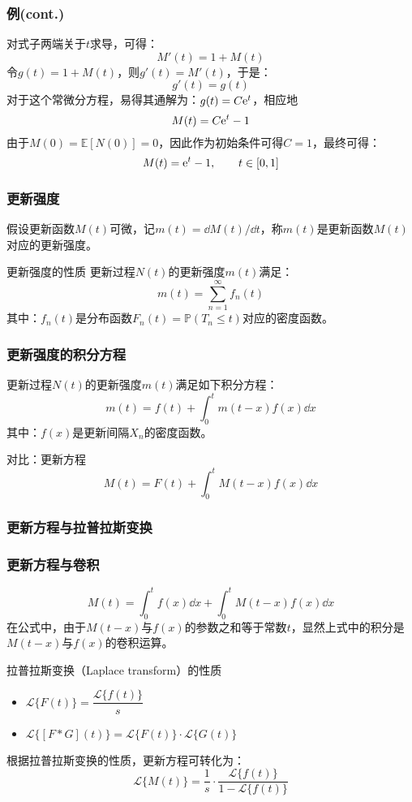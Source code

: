\documentclass[t]{beamer}
\renewcommand{\Pr}{\mathbb{P}}
\newcommand{\E}{\mathbb{E}}
\newcommand{\laplace}[2]{\mathcal{L}\{#1(#2)\}}
\begin{document}
\begin{frame}
  \frametitle{例(cont.)}
  对式子两端关于$t$求导，可得：
  \[    M'(t)=1+M(t)\]
  令$g(t)=1+M(t)$，则$g'(t)=M'(t)$，于是：
  \[g'(t) = g(t)\]
  对于这个常微分方程，易得其通解为：$g(t)=C{\rm e}^t$，相应地
  \[M(t)=C{\rm e}^t - 1\]
  由于$M(0)=\E[N(0)]=0$，因此作为初始条件可得$C=1$，最终可得：
  \[M(t)={\rm e}^t-1,\qquad t\in[0,1]\]
  

\end{frame}


\begin{frame}
  \frametitle{更新强度}
  假设更新函数$M(t)$可微，记$m(t)=\dd M(t)/\dd t$，称$m(t)$是更新函数$M(t)$对应的更新强度。
  
  \begin{block}{更新强度的性质}
    更新过程$N(t)$的更新强度$m(t)$满足：
    \begin{equation*}
        m(t)=\sum^{\infty}_{n=1}f_n(t)
    \end{equation*}
    其中：$f_n(t)$是分布函数$F_n(t)=\Pr(T_n\le t)$对应的密度函数。
    \end{block}
\end{frame}


\begin{frame}
  \frametitle{更新强度的积分方程}
  更新过程$N(t)$的更新强度$m(t)$满足如下积分方程：
  \begin{equation*}
      m(t)=f(t)+\int^t_0 m(t-x)f(x)\dd x
  \end{equation*}
  其中：$f(x)$是更新间隔$X_n$的密度函数。
  
\begin{block}{对比：更新方程}
  \begin{equation*}
    M(t)=F(t) +\int^{t}_0 M(t-x) f(x)\dd x 
\end{equation*}
\end{block}
\end{frame}


\subsubsection{更新方程与拉普拉斯变换}
\begin{frame}
  \frametitle{更新方程与卷积}
  \begin{equation*}
    M(t)=\int^t_0 f(x)\dd x+\int^{t}_0 M(t-x) f(x)\dd x 
\end{equation*}
在公式中，由于$M(t-x)$与$f(x)$的参数之和等于常数$t$，显然上式中的积分是$M(t-x)$与$f(x)$的卷积运算。

\begin{block}{拉普拉斯变换（Laplace transform）的性质}
  \begin{itemize}
    \item $\laplace{F}{t}=\dfrac{\laplace{f}{t}}{s}$
    \item $\laplace{[F*G]}{t}=\laplace{F}{t}\cdot \laplace{G}{t}$
  \end{itemize}
\end{block}
根据拉普拉斯变换的性质，更新方程可转化为：
\[    \laplace{M}{t}=\frac{1}{s}\cdot \frac{\laplace{f}{t}}{1-\laplace{f}{t}}\]
\end{frame}
\end{document}
